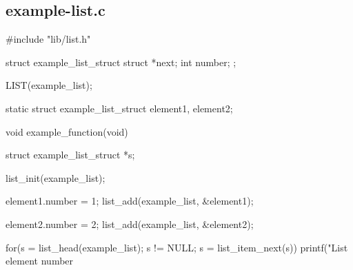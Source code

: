 \hypertarget{a00004}{\subsection{example-\/list.\-c}
}

\begin{DoxyCodeInclude}
#include "lib/list.h"

struct example_list_struct {
  struct *next;
  int number;
};

LIST(example_list);

static struct example_list_struct element1, element2;

void
example_function(void)
{
  struct example_list_struct *s;

  list_init(example_list);

  element1.number = 1;
  list_add(example_list, &element1);

  element2.number = 2;
  list_add(example_list, &element2);

  for(s = list_head(example_list);
      s != NULL;
      s = list_item_next(s)) {
    printf("List element number %
  }
}
\end{DoxyCodeInclude}
 